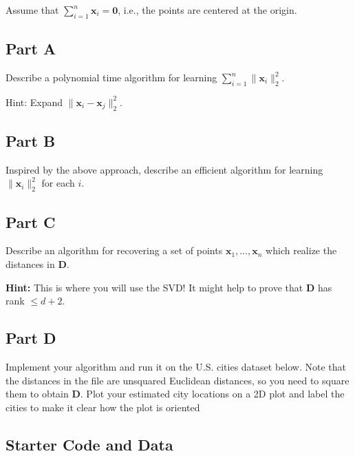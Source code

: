 \documentclass{article}
\begin{document}
Assume that \(\sum_{i=1}^n \mathbf{x}_i = \mathbf{0}\), i.e., the points are centered at the origin.

\hypertarget{part-a}{%
\subsection*{Part A}\label{part-a}}

Describe a polynomial time algorithm for learning \(\sum_{i=1}^n \|\mathbf{x}_i\|_2^2\).

Hint: Expand \(\| \mathbf{x}_i - \mathbf{x}_j\|_2^2\).

\hypertarget{part-b}{%
\subsection*{Part B}\label{part-b}}

Inspired by the above approach, describe an efficient algorithm for learning \(\| \mathbf{x}_i \|_2^2\) for each \(i\).

\hypertarget{part-c}{%
\subsection*{Part C}\label{part-c}}

Describe an algorithm for recovering a set of points \(\mathbf{x}_1,\ldots, \mathbf{x}_n\) which realize the distances in \(\mathbf{D}\).

\textbf{Hint:} This is where you will use the SVD! It might help to prove that \(\mathbf{D}\) has rank \(\leq d + 2\).

\hypertarget{part-d}{%
\subsection*{Part D}\label{part-d}}

Implement your algorithm and run it on the U.S. cities dataset below. Note that the distances in the file are unsquared Euclidean distances, so you need to square them to obtain \(\mathbf{D}\). Plot your estimated city locations on a 2D plot and label the cities to make it clear how the plot is oriented

\subsection*{Starter Code and Data}

\end{document}
